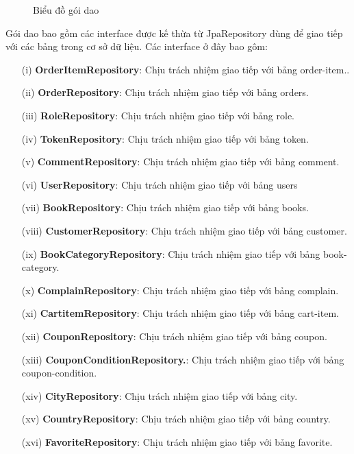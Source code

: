 \documentclass[../DoAn.tex]{subfiles}
\begin{document}
\begin{figure}[H]
    \centering
    \caption{Biểu đồ gói dao}
    \label{fig:Fig5}
\end{figure}
Gói dao bao gồm các interface được kế thừa từ JpaRepository dùng để giao tiếp với các bảng trong cơ sở dữ liệu. Các interface ở đây bao gôm:
\begin{enumerate}
    \item [(i)] \textbf{OrderItemRepository}: Chịu trách nhiệm giao tiếp với bảng order-item..
    \item [(ii)]\textbf{OrderRepository}: Chịu trách nhiệm giao tiếp với bảng orders.
    \item[(iii)] \textbf{RoleRepository}: Chịu trách nhiệm giao tiếp với bảng role.
    \item[(iv)] \textbf{TokenRepository}: Chịu trách nhiệm giao tiếp với bảng token.
    \item[(v)] \textbf{CommentRepository}: Chịu trách nhiệm giao tiếp với bảng comment.
    \item[(vi)] \textbf{UserRepository}: Chịu trách nhiệm giao tiếp với bảng users
    \item[(vii)] \textbf{BookRepository}: Chịu trách nhiệm giao tiếp với bảng books.
    \item[(viii)] \textbf{CustomerRepository}: Chịu trách nhiệm giao tiếp với bảng customer.
    \item[(ix)] \textbf{BookCategoryRepository}: Chịu trách nhiệm giao tiếp với bảng book-category.
    \item[(x)] \textbf{ComplainRepository}: Chịu trách nhiệm giao tiếp với bảng complain.
    \item[(xi)] \textbf{CartitemRepository}: Chịu trách nhiệm giao tiếp với bảng cart-item.
    \item[(xii)] \textbf{CouponRepository}: Chịu trách nhiệm giao tiếp với bảng coupon.
    \item[(xiii)] \textbf{CouponConditionRepository.}: Chịu trách nhiệm giao tiếp với bảng coupon-condition. 
    \item[(xiv)] \textbf{CityRepository}: Chịu trách nhiệm giao tiếp với bảng city.
    \item[(xv)] \textbf{CountryRepository}: Chịu trách nhiệm giao tiếp với bảng country.
    \item[(xvi)] \textbf{FavoriteRepository}: Chịu trách nhiệm giao tiếp với bảng favorite.    
\end{enumerate}
\end{document}
